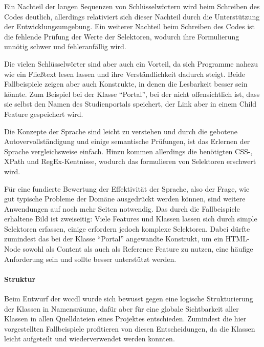    Ein Nachteil der langen Sequenzen von Schlüsselwörtern wird beim Schreiben des Codes
    deutlich, allerdings relativiert sich dieser Nachteil durch die Unterstützung der Entwicklungsumgebung.
    Ein weiterer Nachteil beim Schreiben des Codes ist die fehlende Prüfung der
    Werte der Selektoren, wodurch ihre Formulierung unnötig schwer und fehleranfällig wird.

    Die vielen Schlüsselwörter sind aber auch ein Vorteil,
    da sich Programme nahezu wie ein Fließtext lesen lassen
    und ihre Verständlichkeit dadurch steigt.
    Beide Fallbeispiele zeigen aber auch Konstrukte,
    in denen die Lesbarkeit besser sein könnte.
    Zum Beispiel bei der Klasse "`Portal"',
    bei der nicht offensichtlich ist,
    dass sie selbst den Namen des Studienportals speichert,
    der Link aber in einem Child Feature gespeichert wird.

    Die Konzepte der Sprache sind leicht zu verstehen
    und durch die gebotene Autovervollständigung und einige
    semantische Prüfungen, ist das Erlernen der Sprache vergleichsweise einfach.
    Hinzu kommen allerdings die benötigten CSS-, XPath und RegEx-Kentnisse,
    wodurch das formulieren von Selektoren erschwert wird.

    Für eine fundierte Bewertung der Effektivität der Sprache,
    also der Frage, wie gut typische Probleme der Domäne ausgedrückt werden können,
    sind weitere Anwendungen auf noch mehr Seiten notwendig.
    Das durch die Fallbeispiele erhaltene Bild ist zweiseitig:
    Viele Features und Klassen lassen sich durch simple Selektoren erfassen,
    einige erfordern jedoch komplexe Selektoren.
    Dabei dürfte zumindest das bei der Klasse "`Portal"' angewandte Konstrukt,
    um ein HTML-Node sowohl als Content als auch als Reference Feature zu nutzen,
    eine häufige Anforderung sein und sollte besser unterstützt werden.

    \paragraph{Struktur}
    Beim Entwurf der \gls{wccdl} wurde sich bewusst gegen
    eine logische Strukturierung der Klassen in Namensräume,
    dafür aber für eine globale Sichtbarkeit aller Klassen
    in allen Quelldateien eines Projektes entschieden.
    Zumindest die hier vorgestellten Fallbeispiele profitieren
    von diesen Entscheidungen,
    da die Klassen leicht aufgeteilt und wiederverwendet werden konnten.